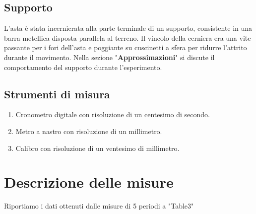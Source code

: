 \documentclass[11pt]{article}
\begin{document}
\subsection{Supporto}
L'asta è stata incernierata alla parte terminale di un supporto, consistente in una barra metellica disposta parallela al terreno. 
Il vincolo della cerniera era una vite passante per i fori dell'asta e poggiante su cuscinetti a sfera per ridurre l'attrito durante il movimento.
Nella sezione "\textbf{Approssimazioni}"  si discute il comportamento del supporto durante l'esperimento.


\subsection{Strumenti di misura}
\begin{enumerate}
\item Cronometro digitale con risoluzione di un centesimo di secondo.
\item Metro a nastro con risoluzione di un millimetro.
\item Calibro con risoluzione di un ventesimo di millimetro.

\end{enumerate}
\section{Descrizione delle misure}

Riportiamo i dati ottenuti dalle misure  di 5 periodi  a "Table3"
\end{document}

